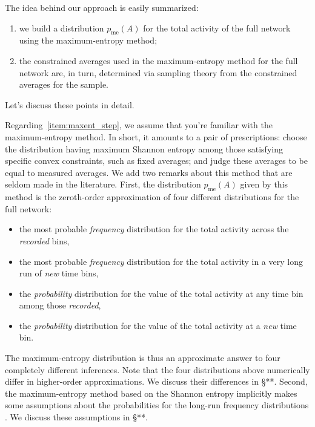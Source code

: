 \documentclass[\ifafour a4paper,12pt,\else a5paper,10pt,\fi%
onecolumn,oneside,article,%
british%
]{memoir}
\theoremstyle{remark}
\theoremstyle{innote}
\newcommand*{\citep}{\parencites}
\renewcommand*{\le}{\leqslant}%
\renewcommand*{\|}{\nonscript\,\vert\nonscript\;\mathopen{}}
\newcommand*{\sect}{\S}%
\newcommand*{\yAv}{A}
\newcommand*{\yFF}{F}
\newcommand*{\yA}{\yAv}%
\newcommand*{\yH}{\varIota}
\newcommand*{\ynuu}{\nu}
\newcommand*{\px}{p_{\text{me}}}
\begin{document}
\bigskip

The idea behind our approach is easily summarized:
\begin{enumerate}[label=(\alph*)]
  \item\label{item:maxent_step} we build a distribution $\px(\yA)$ for the total
  activity of the full network using the maximum-entropy method;
  \item\label{item:sample_step} the constrained averages used in the
  maximum-entropy method for the full network are, in turn, determined via
  sampling theory from the constrained averages for the sample.
\end{enumerate}
Let's discuss these points in detail.

Regarding~\ref{item:maxent_step}, we assume that you're familiar with the
maximum-entropy method. In short, it amounts to a pair of prescriptions:
choose the distribution having maximum Shannon entropy among those
satisfying specific convex constraints, such as fixed averages; and judge
these averages to be equal to measured averages. We add two remarks about
this method that are seldom made in the literature. First, the distribution
$\px(\yA)$ given by this method is the zeroth-order approximation of four
different distributions for the full network:
\begin{itemize}
\item the most probable \emph{frequency} distribution for the total
  activity across the \emph{recorded} bins, %
\item the most probable \emph{frequency} distribution for the total
  activity in a very long run of \emph{new} time bins, %
\item the \emph{probability} distribution for the value of the total
  activity at any time bin among those \emph{recorded},
\item the \emph{probability} distribution for the value of the total
  activity at a \emph{new} time bin.
\end{itemize}
The maximum-entropy distribution is thus an approximate answer to four
completely different inferences. Note that the four distributions above
numerically differ in higher-order approximations. We discuss their
differences in \sect***. Second, the maximum-entropy method based on the
Shannon entropy implicitly makes some assumptions about the probabilities
for the long-run frequency distributions
\citep{jaynes1986d_r1996,portamana2009,portamana2017}. We discuss these
assumptions in \sect***.
\end{document}
